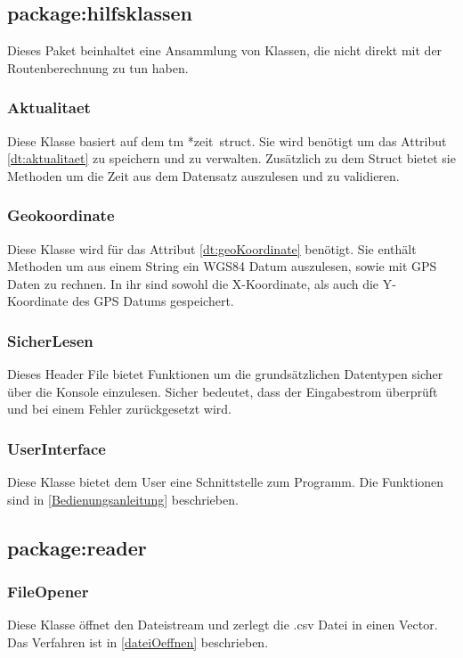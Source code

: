 \documentclass[12pt, a4paper, ngerman]{article}
\begin{document}
\subsection{package:hilfsklassen}
Dieses Paket beinhaltet eine Ansammlung von Klassen, die nicht direkt mit der Routenberechnung zu tun haben.
\subsubsection{Aktualitaet \label{class:Aktualitaet}}
Diese Klasse basiert auf dem \glqq tm *zeit\grqq~struct. Sie wird benötigt um das Attribut \ref{dt:aktualitaet} zu speichern und zu verwalten. Zusätzlich zu dem Struct bietet sie Methoden um die Zeit aus dem Datensatz auszulesen und zu validieren.

\subsubsection{Geokoordinate}
Diese Klasse wird für das Attribut \ref{dt:geoKoordinate} benötigt. Sie enthält Methoden um aus einem String ein WGS84 Datum auszulesen, sowie mit GPS Daten zu rechnen. In ihr sind sowohl die X-Koordinate, als auch die Y-Koordinate des GPS Datums gespeichert.

\subsubsection{SicherLesen}
Dieses Header File bietet Funktionen um die grundsätzlichen Datentypen sicher über die Konsole einzulesen. Sicher bedeutet, dass der Eingabestrom überprüft und bei einem Fehler zurückgesetzt wird.


\subsubsection{UserInterface \label{UserInterface}}
Diese Klasse bietet dem User eine Schnittstelle zum Programm. Die Funktionen sind in \ref{Bedienungsanleitung} beschrieben.

\subsection{package:reader}
\subsubsection{FileOpener \label{class:FileOpener}}
Diese Klasse öffnet den Dateistream und zerlegt die .csv Datei in einen Vector. Das Verfahren ist in \ref{dateiOeffnen} beschrieben.
\end{document}
